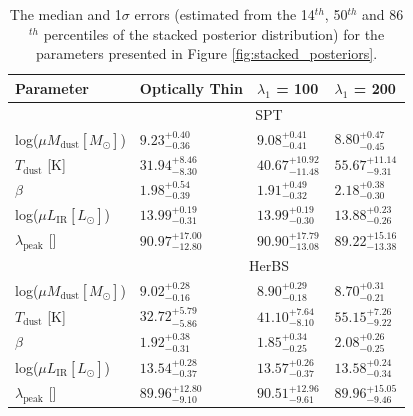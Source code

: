 \begin{table}
    \centering
    \begin{tabular}{|p{3cm}|p{2.5cm}|p{2.5cm}|p{2.5cm}|}
        \hline
		Parameter & Optically Thin & $\lambda_1$ = 100\,\micron & $\lambda_1$ = 200\,\micron \\
		\hline
		\hline
		 & \multicolumn{3}{|c|}{SPT} \\
        \hline
        log($\mu M_{\textrm{dust}} [M_\odot]$) & $9.23_{-0.36}^{+0.40}$ & $9.08_{-0.41}^{+0.41}$ & $8.80_{-0.45}^{+0.47}$ \\
		$T_{\textrm{dust}}$ [K] & $31.94_{-8.30}^{+8.46}$ & $40.67_{-11.48}^{+10.92}$ & $55.67_{-9.31}^{+11.14}$ \\
		$\beta$ & $1.98_{-0.39}^{+0.54}$ & $1.91_{-0.32}^{+0.49}$ & $2.18_{-0.30}^{+0.38}$ \\
		log($\mu L_{\textrm{IR}} [L_\odot]$) & $13.99_{-0.31}^{+0.19}$ & $13.99_{-0.30}^{+0.19}$ & $13.88_{-0.26}^{+0.23}$ \\
		$\lambda_{\textrm{peak}}$ [\micron] & $90.97_{-12.80}^{+17.00}$ & $90.90_{-13.08}^{+17.79}$ & $89.22_{-13.38}^{+15.16}$ \\
		\hline
		\hline
		& \multicolumn{3}{|c|}{HerBS} \\
        \hline
        log($\mu M_{\textrm{dust}} [M_\odot]$) & $9.02_{-0.16}^{+0.28}$ & $8.90_{-0.18}^{+0.29}$ & $8.70_{-0.21}^{+0.31}$ \\
		$T_{\textrm{dust}}$ [K] & $32.72_{-5.86}^{+5.79}$ & $41.10_{-8.10}^{+7.64}$ & $55.15_{-9.22}^{+7.26}$ \\
		$\beta$ & $1.92_{-0.31}^{+0.38}$ & $1.85_{-0.25}^{+0.34}$ & $2.08_{-0.25}^{+0.26}$ \\
		log($\mu L_{\textrm{IR}} [L_\odot]$) & $13.54_{-0.37}^{+0.28}$ & $13.57_{-0.37}^{+0.26}$ & $13.58_{-0.34}^{+0.24}$ \\
		$\lambda_{\textrm{peak}}$ [\micron] & $89.96_{-9.10}^{+12.80}$ & $90.51_{-9.61}^{+12.96}$ & $89.96_{-9.46}^{+15.05}$ \\
        \hline
    \end{tabular}
    \caption{The median and 1$\sigma$ errors (estimated from the 14$^{th}$, 50$^{th}$ and 86$^{th}$ percentiles of the stacked posterior distribution) for the parameters presented in Figure \ref{fig:stacked_posteriors}.}
    \label{tab:parameter_results}
\end{table}

